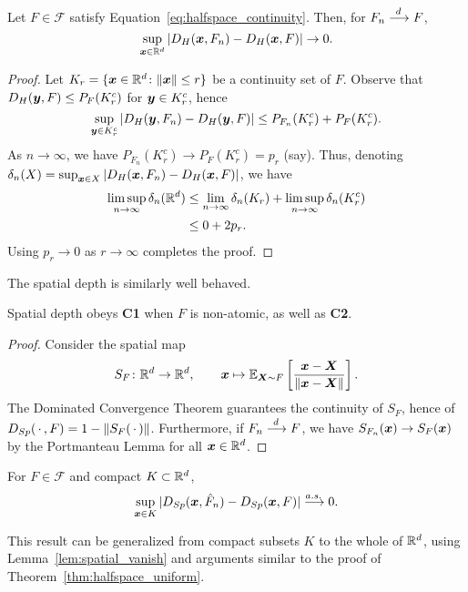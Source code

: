 \begin{theorem}\label{thm:halfspace_uniform}
    Let $F \in \mathscr{F}$ satisfy Equation~\ref{eq:halfspace_continuity}.
    Then, for $F_n \overset{d\,}{\longrightarrow} F$,
    \begin{equation}
        \sup_{\bm{x} \in \mathbb{R}^d} |D_H(\bm{x}, F_n) - D_H(\bm{x}, F)| \to 0.
    \end{equation}
\end{theorem}
\begin{proof}
    Let $K_r = \{\bm{x} \in \mathbb{R}^d\colon \Vert \bm{x} \Vert \leq r\}$ be a continuity set
    of $F$.
    Observe that $D_H(\bm{y}, F) \leq P_F(K_r^c)$ for $\bm{y} \in K_r^c$, hence
    \begin{equation}
        \sup_{\bm{y} \in K_r^c} |D_H(\bm{y}, F_n) - D_H(\bm{y}, F)| \leq P_{F_n}(K_r^c) + P_F(K_r^c).
    \end{equation}
    As $n \to \infty$, we have $P_{F_n}(K_r^c) \to P_F(K_r^c) = p_r$ (say).
    Thus, denoting $\delta_n(X) = \sup_{\bm{x} \in X} |D_H(\bm{x}, F_n) - D_H(\bm{x},
    F)|$, we have
    \begin{align}
        \limsup_{n \to \infty} \delta_n(\mathbb{R}^d)
        &\leq \lim_{n \to \infty} \delta_n(K_r) + \limsup_{n \to \infty} \delta_n(K_r^c) \\
        &\leq 0 + 2p_r.
    \end{align}
    Using $p_r \to 0$ as $r \to \infty$ completes the proof.
\end{proof}



The spatial depth is similarly well behaved.

\begin{theorem}
    Spatial depth obeys \textbf{C1} when $F$ is non-atomic, as well as
    \textbf{C2}.
\end{theorem}
\begin{proof}
    Consider the spatial map
    \begin{equation}
        S_F\colon \mathbb{R}^d \to \mathbb{R}^d, \qquad
        \bm{x} \mapsto \operatorname{\mathbb{E}}_{\bm{X} \sim F}\left[\frac{\bm{x} - \bm{X}}{\Vert \bm{x} - \bm{X} \Vert}\right].
    \end{equation}
    The Dominated Convergence Theorem guarantees the continuity of $S_F$,
    hence of $D_{Sp}(\,\cdot\,, F) = 1 - \Vert S_F(\,\cdot\,) \Vert$.
    Furthermore, if $F_n \overset{d\,}{\longrightarrow} F$, we have $S_{F_n}(\bm{x}) \to S_F(\bm{x})$ by the
    Portmanteau Lemma for all $\bm{x} \in \mathbb{R}^d$.
\end{proof}

\begin{theorem}
    For $F \in \mathscr{F}$ and compact $K \subset \mathbb{R}^d$,
    \begin{equation}
        \sup_{\bm{x} \in K} |D_{Sp}(\bm{x}, \hat{F}_n) - D_{Sp}(\bm{x}, F)| \overset{a.s.\,}{\longrightarrow} 0.
    \end{equation}
\end{theorem}

\begin{remark}
    This result can be generalized from compact subsets $K$ to the whole of
    $\mathbb{R}^d$, using Lemma~\ref{lem:spatial_vanish} and arguments similar to the
    proof of Theorem~\ref{thm:halfspace_uniform}.
\end{remark}


